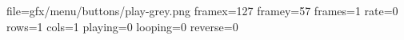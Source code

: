 file=gfx/menu/buttons/play-grey.png
framex=127
framey=57
frames=1
rate=0
rows=1
cols=1
playing=0
looping=0
reverse=0